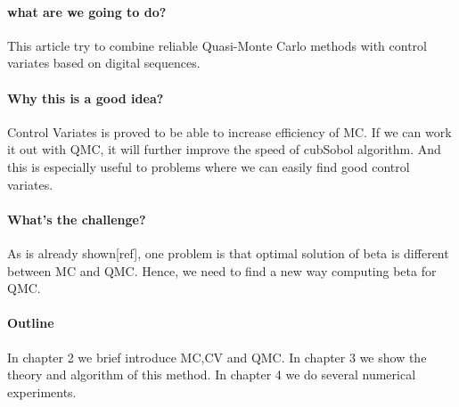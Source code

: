 \paragraph{what are we going to do?}
This article try to combine reliable Quasi-Monte Carlo methods with control variates based on digital sequences.\\

\paragraph{Why this is a good idea?} 
Control Variates is proved to be able to increase efficiency of MC. If we can work it out with QMC, it will further improve the speed of cubSobol algorithm. And this is especially useful to problems where we can easily find good control variates.

\paragraph{What's the challenge?}
As is already shown[ref], one problem is that optimal solution of beta is different between MC and QMC. Hence, we need to find a new way computing beta for QMC.\\
 
\paragraph{Outline}
In chapter 2 we brief introduce MC,CV and QMC.
In chapter 3 we show the theory and algorithm of this method.
In chapter 4 we do several numerical experiments.  
